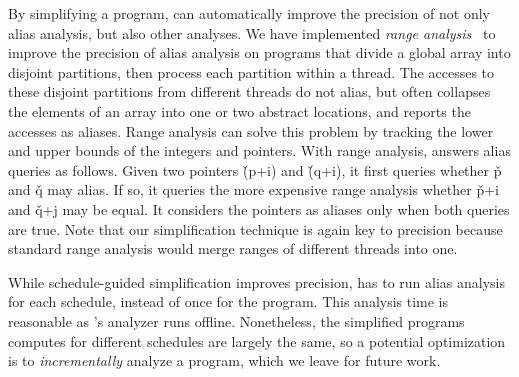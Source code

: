 By simplifying a program, \peregrine can automatically improve the precision of
not only alias analysis, but also other analyses.  We have
implemented \emph{range analysis}~\cite{range:pldi00} to improve
the precision of alias analysis on programs
that divide a global array into disjoint partitions, then process each
partition within a thread.
The accesses to these disjoint partitions from different threads do
not alias, but \bddbddb often collapses the elements of an array into one
or two abstract locations, and reports the accesses as aliases.  Range
analysis can solve this problem by tracking the lower and upper bounds of
the integers and pointers.  With range analysis, \peregrine answers alias queries
as follows.  Given two pointers
\v{(p+i)} and \v{(q+i)}, it first queries \bddbddb whether \v{p} and \v{q} may alias.
If so, it queries the more expensive range analysis whether \v{p+i} and
\v{q+j} may be equal.  It considers the pointers as aliases only when both
queries are true.  Note that our simplification technique is again key
to precision because standard range analysis would merge ranges of different threads
into one.






While schedule-guided simplification improves precision, \peregrine has to run
alias analysis for each schedule, instead of once for the program.  This
analysis time is reasonable as \peregrine's analyzer runs offline.  Nonetheless,
the simplified programs \peregrine computes for different schedules are largely
the same, so a potential optimization is to \emph{incrementally} analyze a
program, which we leave for future work.



